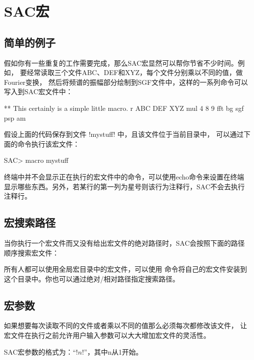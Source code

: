 \section{SAC宏}
\label{sec:macros}

\subsection{简单的例子}
假如你有一些重复的工作需要完成，那么SAC宏显然可以帮你节省不少时间。例如，
要经常读取三个文件ABC、DEF和XYZ，每个文件分别乘以不同的值，做Fourier变换，
然后将频谱的振幅部分绘制到SGF文件中，这样的一系列命令可以写入到SAC宏文件中：
\begin{SACCode}
** This certainly is a simple little macro.
r ABC DEF XYZ
mul 4 8 9
fft
bg sgf
psp am
\end{SACCode}

假设上面的代码保存到文件 !mystuff! 中，且该文件位于当前目录中，
可以通过下面的命令执行该宏文件：
\begin{SACCode}
SAC> macro mystuff
\end{SACCode}
终端中并不会显示正在执行的宏文件中的命令，可以使用echo命令来设置在终端
显示哪些东西。另外，若某行的第一列为星号则该行为注释行，SAC不会去执行
注释行。

\subsection{宏搜索路径}
当你执行一个宏文件而又没有给出宏文件的绝对路径时，SAC会按照下面的路径
顺序搜索宏文件：

所有人都可以使用全局宏目录中的宏文件，可以使用 
命令将自己的宏文件安装到这个目录中。你也可以通过绝对/相对路径指定搜索路径。

\subsection{宏参数}
如果想要每次读取不同的文件或者乘以不同的值那么必须每次都修改该文件，
让宏文件在执行之前允许用户输入参数可以大大增加宏文件的灵活性。

SAC宏参数的格式为：``!$n$!''，其中n从1开始。

